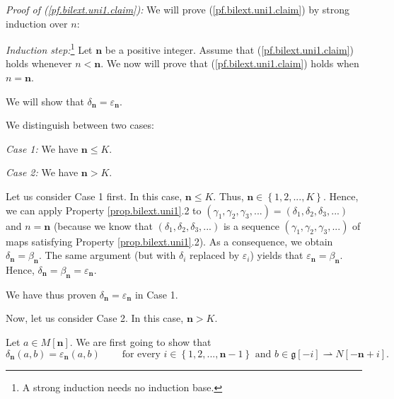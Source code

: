 \documentclass[etingof-lie.tex]{subfiles}
\begin{document}
\begin{noncompile}
\begin{verlong}
\textit{Proof of (\ref{pf.bilext.uni1.claim}):} We will prove
(\ref{pf.bilext.uni1.claim}) by strong induction over $n$:

\textit{Induction step:}\footnote{A strong induction needs no induction base.}
Let $\mathbf{n}$ be a positive integer. Assume that
(\ref{pf.bilext.uni1.claim}) holds whenever $n<\mathbf{n}$. We now will prove
that (\ref{pf.bilext.uni1.claim}) holds when $n=\mathbf{n}$.

We will show that $\delta_{\mathbf{n}}=\varepsilon_{\mathbf{n}}$.

We distinguish between two cases:

\textit{Case 1:} We have $\mathbf{n}\leq K$.

\textit{Case 2:} We have $\mathbf{n}>K$.

Let us consider Case 1 first. In this case, $\mathbf{n}\leq K$. Thus,
$\mathbf{n}\in\left\{  1,2,...,K\right\}  $. Hence, we can apply Property
\ref{prop.bilext.uni1}.2 to $\left(  \gamma_{1},\gamma_{2},\gamma
_{3},...\right)  =\left(  \delta_{1},\delta_{2},\delta_{3},...\right)  $ and
$n=\mathbf{n}$ (because we know that $\left(  \delta_{1},\delta_{2},\delta
_{3},...\right)  $ is a sequence $\left(  \gamma_{1},\gamma_{2},\gamma
_{3},...\right)  $ of maps satisfying Property \ref{prop.bilext.uni1}.2). As a
consequence, we obtain $\delta_{\mathbf{n}}=\beta_{\mathbf{n}}$. The same
argument (but with $\delta_{i}$ replaced by $\varepsilon_{i}$) yields that
$\varepsilon_{\mathbf{n}}=\beta_{\mathbf{n}}$. Hence, $\delta_{\mathbf{n}%
}=\beta_{\mathbf{n}}=\varepsilon_{\mathbf{n}}$.

We have thus proven $\delta_{\mathbf{n}}=\varepsilon_{\mathbf{n}}$ in Case 1.

Now, let us consider Case 2. In this case, $\mathbf{n}>K$.

Let $a\in M\left[  \mathbf{n}\right]  $. We are first going to show that
\begin{equation}
\delta_{\mathbf{n}}\left(  a,b\right)  =\varepsilon_{\mathbf{n}}\left(
a,b\right)  \ \ \ \ \ \ \ \ \ \ \text{for every }i\in\left\{
1,2,...,\mathbf{n}-1\right\}  \text{ and }b\in\mathfrak{g}\left[  -i\right]
\rightharpoonup N\left[  -\mathbf{n}+i\right]  \text{.}
\label{pf.bilext.uni1.1}%
\end{equation}



\end{verlong}
\end{noncompile}
\end{document}
